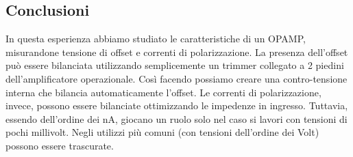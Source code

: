 








\subsection{Conclusioni}
In questa esperienza abbiamo studiato le caratteristiche di un OPAMP, misurandone tensione di offset e correnti di polarizzazione. La presenza dell'offset può essere bilanciata utilizzando semplicemente un trimmer collegato a 2 piedini dell'amplificatore operazionale. Così facendo possiamo creare una contro-tensione interna che bilancia automaticamente l'offset. Le correnti di polarizzazione, invece, possono essere bilanciate ottimizzando le impedenze in ingresso. Tuttavia, essendo dell'ordine dei \si{\nano\ampere}, giocano un ruolo solo nel caso si lavori con tensioni di pochi millivolt. Negli utilizzi più comuni (con tensioni dell'ordine dei Volt) possono essere trascurate.




